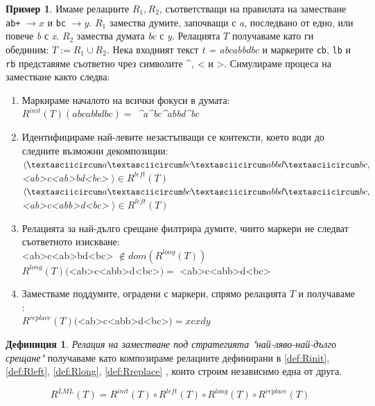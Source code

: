 \documentclass[12pt, oneside]{article}
\theoremstyle{definition}
\newtheorem{definition}{Дефиниция}[section]
\newtheorem{example}{Пример}[section]
\begin{document}
\begin{example}
	Имаме релациите \( R_1, R_2 \), съответстващи на правилата на заместване \verb/ab+/ \( \to x \) и \verb/bc/ \( \to y \). \(R_1\) замества думите, започващи с \emph{a}, последвано от едно, или повече \emph{b} с \emph{x}. \(R_2\) замества думата \emph{bc} с \emph{y}. Релацията \(T\) получаваме като ги обединим: \( T := R_1 \cup R_2 \). Нека входният текст \emph{t = abcabbdbc} и маркерите \verb/cb/, \verb/lb/ и \verb/rb/ представяме съответно чрез символите \textasciicircum, < и >. Симулираме процеса на заместване както следва:
	\begin{enumerate}
		\item Маркираме началото на всички фокуси в думата: \\ \( R^{init}(T)(abcabbdbc) = \) \emph{\textasciicircum a\textasciicircum bc\textasciicircum abbd\textasciicircum bc}
		\item Идентифицираме най-левите незастъпващи се контексти, което води до следните възможни декомпозиции: \\ 
		\( \langle \textasciicircum a\textasciicircum bc\textasciicircum abbd\textasciicircum bc,\) \emph{<ab>c<ab>bd<bc>} \(\rangle \in R^{left}(T) \) \\
		\( \langle \textasciicircum a\textasciicircum bc\textasciicircum abbd\textasciicircum bc,\) \emph{<ab>c<abb>d<bc>} \(\rangle \in R^{left}(T) \)
		\item Релацията за най-дълго срещане филтрира думите, чиито маркери не следват съответното изискване: \\
		<ab>c<ab>bd<bc> \( \notin dom(R^{long}(T)) \) \\
		\( R^{long}(T)(\)<ab>c<abb>d<bc>\() = \) <ab>c<abb>d<bc>
		\item Заместваме поддумите, оградени с маркери, спрямо релацията \(T\) и получаваме : \\
		\( R^{replace}(T)(\)<ab>c<abb>d<bc>\() = xcxdy \)
	\end{enumerate}
\end{example}

\begin{definition} \emph{Релация на заместване под стратегията "най-ляво-най-дълго срещане"} получаваме като композираме релациите дефинирани в \ref{def:Rinit}, \ref{def:Rleft}, \ref{def:Rlong}, \ref{def:Rreplace} , които строим независимо една от друга.

\[ R^{LML}(T) = R^{init}(T) \circ R^{left}(T) \circ R^{long}(T) \circ R^{replace}(T) \]
\end{definition}
\end{document}
